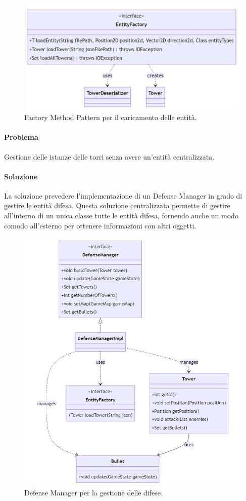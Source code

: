 \documentclass[a4paper,12pt]{report}
\begin{document}
\begin{figure}[H]
    \centering
    \includegraphics[width=1.1\linewidth]{entity_factory}
    \caption{Factory Method Pattern per il caricamento delle entità.}
    \label{fig:entity_factory}
\end{figure}
\vspace{70mm}

\paragraph{Problema}
Gestione delle istanze delle torri senza avere un'entità centralizzata.
\paragraph{Soluzione}
La soluzione prevedere l'implementazione di un Defense Manager in grado di gestire le entità difesa. Questa soluzione centralizzata permette di gestire all'interno di un unica classe tutte le entità difesa, fornendo anche un modo comodo all'esterno per ottenere informazioni con altri oggetti.

\begin{figure}[H]
    \centering
    \includegraphics[width=0.8\linewidth]{defense_manager}
    \caption{Defense Manager per la gestione delle difese.}
    \label{fig:defense_manager}
\end{figure}
\end{document}
